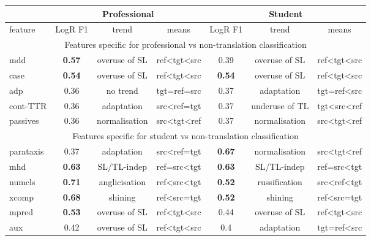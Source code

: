 \begin{longtable}[H]{p{1.84cm}|ccc||ccc}
	\toprule
	&      \multicolumn{3}{c}{Professional} 	&      \multicolumn{3}{c}{Student}\\
	\midrule
	feature & LogR F1 & trend & means   & LogR F1 & trend   & means   \\
	\midrule
	\multicolumn{7}{c}{Features specific for professional vs non-translation classification} \\
	\midrule
	mdd           & \textbf{0.57} & overuse of SL & ref\textless{}tgt\textless{}src & 0.39 & overuse of SL  & ref\textless{}tgt\textless{}src \\
	case          & \textbf{0.54} & overuse of SL & ref\textless{}tgt\textless{}src & \textbf{0.54} & overuse of SL  & ref\textless{}tgt\textless{}src \\
	adp           & 0.36 & no trend       & tgt=ref=src                     & 0.37 & adaptation     & tgt=ref\textless{}src           \\
	cont-TTR  & 0.36 & adaptation    & src\textless{}ref=tgt           & 0.37 & underuse of TL & tgt\textless{}src\textless{}ref \\
	passives      & 0.36 & normalisation & src\textless{}tgt\textless{}ref & 0.37 & normalisation  & src\textless{}tgt\textless{}ref \\
	\midrule
	\multicolumn{7}{c}{Features specific for student vs non-translation classification} \\
	\midrule
	parataxis     & 0.37 & adaptation    & src\textless{}ref=tgt           & \textbf{0.67} & normalisation & src\textless{}tgt\textless{}ref \\
	mhd           & \textbf{0.63} & SL/TL-indep   & ref=src\textless{}tgt           & \textbf{0.63} & SL/TL-indep   & ref=src\textless{}tgt           \\
	numcls        & \textbf{0.71} & anglicisation & ref\textless{}src\textless{}tgt & \textbf{0.52} & russification & src\textless{}ref\textless{}tgt \\
	xcomp         & \textbf{0.68} & shining       & ref\textless{}src=tgt           & \textbf{0.52} & shining       & ref\textless{}src=tgt           \\
	mpred         & \textbf{0.53} & overuse of SL & ref\textless{}tgt\textless{}src & 0.44 & overuse of SL & ref\textless{}tgt\textless{}src \\
	aux           & 0.42 & overuse of SL & ref\textless{}tgt\textless{}src & 0.4  & adaptation    & tgt=ref\textless{}src           \\

\end{longtable}

